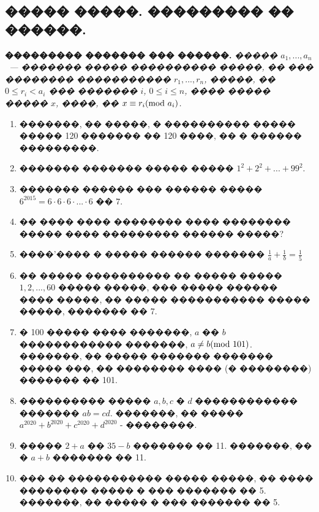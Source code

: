 \documentclass[a4paper,12pt]{article}
\begin{document}
\newpage

\begin{center}
\section*{����� �����. ��������� �� ������. }
\end{center}

\textbf{��������� ������� ��� ������.} \textit{����� $a_{1},...,a_{n}$~--- ������� ����� ���������� �����, �� ��� �������� ����������� $r_{1},...,r_{n}$, �����, �� $0\leq r_{i}<a_{i}$ ��� ������� $i$, $0\leq i\leq n$, ���� ����� ����� $x$, ����, �� $x\equiv r_{i}(\textmd{mod }a_{i})$.}

\medskip\medskip\medskip

\begin{enumerate}
\item �������, �� �����, � ���������� ����� ����� 120 ������� �� 120 ����, �� � ������ ���������.

\item ������� ������� ����� ����� $1^{2}+2^{2}+...+99^{2}$.

\item ������� ������ ��� ������ ����� $6^{2015}=6\cdot 6\cdot 6\cdot ... \cdot 6$ �� $7$.

\item �� ���� ���� �������� ���� �������� ����� ���� ��������� ������ �����?

\item ����'���� � ����� ������ ������� $\frac{1}{a}+\frac{1}{b}=\frac{1}{5}$

\item �� ����� ���������� �� ����� ����� $1,2,...,60$ ����� �����, ��� ����� ������ ���� �����, �� ����� ����������� ����� �����, ������� �� 7.


\item � 100 ����� ���� �������, $a$ �� $b$ ������������ �������, $a\neq b (\textmd{mod } 101)$. �������, �� ����� ������� ������� ����� ���, �� �������� ���� (� ��������) ������� �� 101.

\item ���������� ����� $a, b, c$ � $d$ ������������ ������� $ab=cd$. �������, �� ����� $a^{2020}+b^{2020}+c^{2020}+d^{2020}$ - ��������.

\item ����� $2+a$ �� $35-b$ ������� �� 11. �������, �� � $a+b$ ������� �� 11.

\item ��� �� ����������� ����� �����, �� ���� �������� ����� � ��� ������� �� 5. �������, �� ����� � ��� ������� �� 5.


\end{enumerate}
\end{document}
